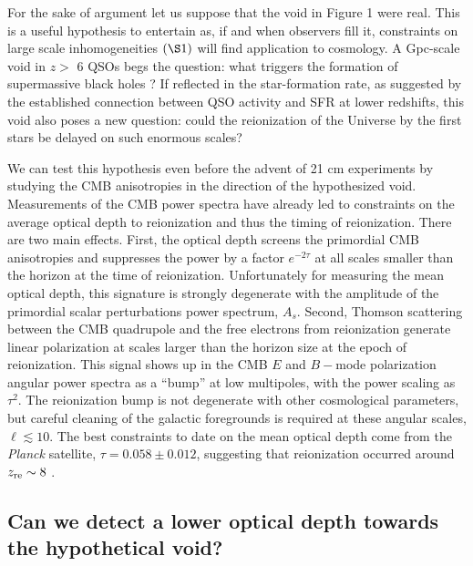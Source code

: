 \documentclass[]{pasa}
\begin{document}
For the sake of argument let us suppose that the void in Figure 1 were real. This is a useful hypothesis to entertain as, if and when observers fill it, constraints on large scale inhomogeneities $(\S 1)$ will find application to cosmology. 
A Gpc-scale void in $z >$ 6 QSOs begs the question: what triggers the formation of supermassive black holes \citep{Wang2017}? 
If reflected in the star-formation rate, as suggested by the established connection between QSO activity and SFR at lower redshifts, this void also poses a new question: 
could the reionization of the Universe by the first stars be delayed on such enormous scales?

We can test this hypothesis even before the advent of 21 cm experiments  by studying the CMB anisotropies in the direction of the hypothesized void.  
Measurements of the CMB power spectra have already led to constraints on the average optical depth to reionization and thus the timing of reionization. 
There are two main effects. 
First, the optical depth screens the primordial CMB anisotropies and suppresses the power by a factor $e^{-2\tau}$ at all scales smaller than the horizon at the time of reionization. 
Unfortunately for measuring the mean optical depth,  this signature is strongly  degenerate with the amplitude of the primordial scalar perturbations power spectrum, $A_s$.  
Second,  Thomson scattering between the  CMB quadrupole and the free electrons from reionization generate linear polarization  at scales larger than the horizon size at the epoch of reionization. 
This signal shows up in the CMB $E$ and $B-$mode polarization angular power spectra as a ``bump'' at low multipoles, with the power scaling as $\tau^2$. 
The reionization bump is not degenerate with other cosmological parameters, but 
careful cleaning of the galactic foregrounds is required at  these angular scales, $\ell \lesssim 10$. 
The best constraints to date on the mean optical depth come from the \textit{Planck} satellite, $\tau = 0.058 \pm 0.012$, suggesting that reionization occurred around $z_{\rm re} \sim 8$ \citep{planck_reio}. 



\subsection{Can we detect a lower optical depth towards the hypothetical void?}
\end{document}
